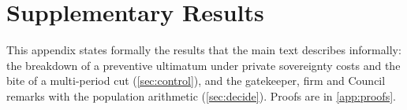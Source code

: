 \section{Supplementary Results}\label{app:supp}

This appendix states formally the results that the main text describes informally: the breakdown of a preventive ultimatum under private sovereignty costs and the bite of a multi-period cut (\cref{sec:control}), and the gatekeeper, firm and Council remarks with the population arithmetic (\cref{sec:decide}). Proofs are in \cref{app:proofs}.



